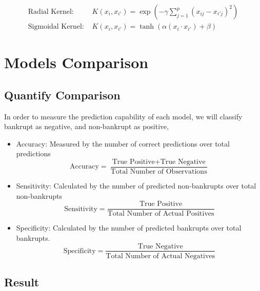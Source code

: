 \documentclass[12pt]{report}
\begin{document}
\begin{equation} \label{kernel}
    \begin{split}
    \text{Radial Kernel: }& K(x_{i}, x_{i'}) = \exp(-\gamma \sum^{p}_{j=1} (x_{ij} - x_{i'j})^{2})
    \\
    \text{Sigmoidal Kernel: }& K(x_{i}, x_{i'}) = \tanh(\alpha(x_{i} \cdot x_{i'}) + \beta)
    \end{split}
\end{equation}

\begingroup
\renewcommand{\cleardoublepage}{}
\renewcommand{\clearpage}{}

\chapter{Models Comparison}
\endgroup
\section{Quantify Comparison}
In order to measure the prediction capability of each model, we will classify bankrupt as negative, and non-bankrupt as positive,
\begin{itemize}
    \item Accuracy: Measured by the number of correct predictions over total predictions
    \begin{equation}
        \text{Accuracy} = \frac{\text{True Positive} + \text{True Negative}}{\text{Total Number of Observations}}
    \end{equation}

    \item Sensitivity: Calculated by the number of predicted non-bankrupts over total non-bankrupts
    \begin{equation}
        \text{Sensitivity} = \frac{\text{True Positive}}{\text{Total Number of Actual Positives}}
    \end{equation}

    \item Specificity: Calculated by the number of predicted bankrupts over total bankrupts.
    \begin{equation}
        \text{Specificity} = \frac{\text{True Negative}}{\text{Total Number of Actual Negatives}}
    \end{equation}
\end{itemize}
\section{Result}
\end{document}
